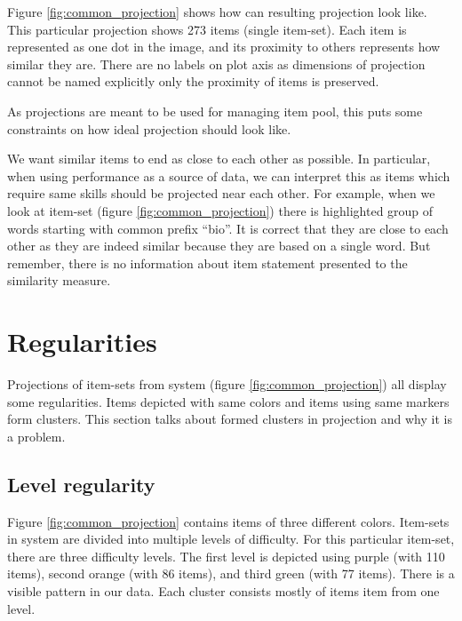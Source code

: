 \documentclass[
  digital, %
  table,   %
  nolof,     %
  nolot,     %
  nocover,
  color,
  final, %
]{fithesis3}
\begin{document}

Figure \ref{fig:common_projection} shows how can resulting projection look like. This particular projection shows 273 items (single item-set). Each item is represented as one dot in the image, and its proximity to others represents how similar they are. There are no labels on plot axis as dimensions of projection cannot be named explicitly only the proximity of items is preserved.


As projections are meant to be used for managing item pool, this puts some constraints on how ideal projection should look like.

We want similar items to end as close to each other as possible. In particular, when using performance as a source of data, we can interpret this as items which require same skills should be projected near each other. For example, when we look at item-set \cvicenieB{} (figure \ref{fig:common_projection}) there is highlighted group of words starting with common prefix ``bio''. It is correct that they are close to each other as they are indeed similar because they are based on a single word. But remember, there is no information about item statement presented to the similarity measure.


\section{Regularities}\label{regularities}


Projections of item-sets from system \umimeCesky{} (figure \ref{fig:common_projection}) all display some regularities. Items depicted with same colors and items using same markers form clusters. This section talks about formed clusters in projection and why it is a problem.


\subsection{Level regularity}\label{regularities-level-regularity}


Figure \ref{fig:common_projection} contains items of three different colors. Item-sets in system \umimeCesky{} are divided into multiple levels of difficulty. For this particular item-set, there are three difficulty levels. The first level is depicted using purple (with 110 items), second orange (with 86 items), and third green (with 77 items). There is a  visible pattern in our data. Each cluster consists mostly of items item from one level.
\end{document}
